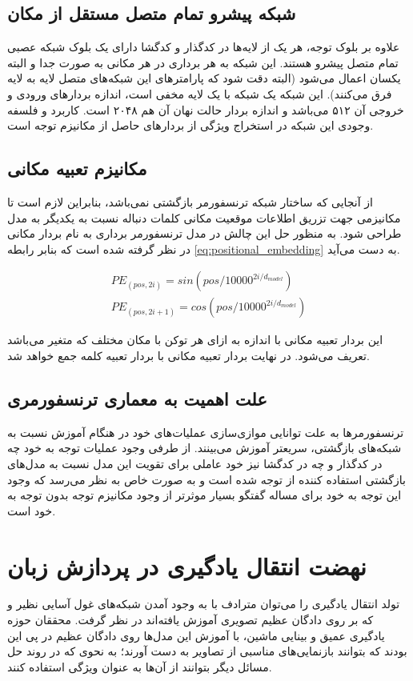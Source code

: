 \subsection{شبکه پیشرو تمام متصل مستقل از مکان}
علاوه بر بلوک توجه، هر یک از لایه‌ها در کدگذار و کدگشا دارای یک بلوک شبکه عصبی تمام متصل پیشرو هستند. این شبکه به هر برداری در هر مکانی به صورت جدا و البته یکسان اعمال می‌شود (البته دقت شود که پارامتر‌های این شبکه‌های متصل لایه به لایه فرق می‌کنند). این شبکه یک شبکه با یک لایه مخفی است، اندازه بردارهای ورودی و خروجی آن ۵۱۲ می‌باشد و اندازه بردار حالت نهان آن هم ۲۰۴۸ است. کاربرد و فلسفه وجودی این شبکه در استخراج ویژگی از بردارهای حاصل از مکانیزم توجه است.


\subsection{
مکانیزم تعبیه
مکانی
}

از آنجایی که ساختار شبکه ترنسفورمر بازگشتی نمی‌باشد، بنابراین لازم است تا مکانیزمی جهت تزریق اطلاعات موقعیت مکانی کلمات دنباله نسبت به یکدیگر به مدل طراحی شود. به منظور حل این چالش در مدل ترنسفورمر برداری به نام بردار 
 مکانی در نظر گرفته شده است که بنابر رابطه
\ref{eq:positional_embedding}
به دست می‌آید.

\begin{align} \label{eq:positional_embedding}
PE_{(pos, 2i)} = sin(pos/10000^{2i/d_{model}}) \\  \nonumber
PE_{(pos, 2i+1)} = cos(pos/10000^{2i/d_{model}}) 
\end{align}

این بردار تعبیه مکانی با اندازه 
 به ازای هر توکن با مکان مختلف که متغیر
می‌باشد تعریف می‌شود. در نهایت بردار تعبیه مکانی با بردار تعبیه کلمه جمع خواهد شد.

\subsection{علت اهمیت به معماری ترنسفورمری}
ترنسفورمر‌ها به علت توانایی موازی‌سازی عملیات‌های خود در هنگام آموزش نسبت به شبکه‌های بازگشتی، سریعتر آموزش می‌بینند. از طرفی وجود عملیات توجه به خود چه در کدگذار و چه در کدگشا نیز خود عاملی برای تقویت این مدل نسبت به مدل‌های بازگشتی استفاده کننده از توجه شده است و به صورت خاص به نظر می‌رسد که وجود این توجه به خود برای مساله گفتگو بسیار موثرتر از وجود مکانیزم توجه بدون توجه به خود است.

\section{نهضت انتقال یادگیری در پردازش زبان}
تولد 
 انتقال یادگیری را می‌توان مترادف با به وجود آمدن شبکه‌های غول آسایی نظیر
و
که بر روی دادگان عظیم تصویری آموزش یافته‌اند در نظر گرفت. محققان حوزه یادگیری عمیق و بینایی ماشین، با آموزش این مدل‌ها روی دادگان عظیم در پی این بودند که بتوانند بازنمایی‌های مناسبی از تصاویر به دست آورند؛ به نحوی که در روند حل مسائل دیگر بتوانند از آن‌ها به عنوان ویژگی‌ استفاده کنند. 

